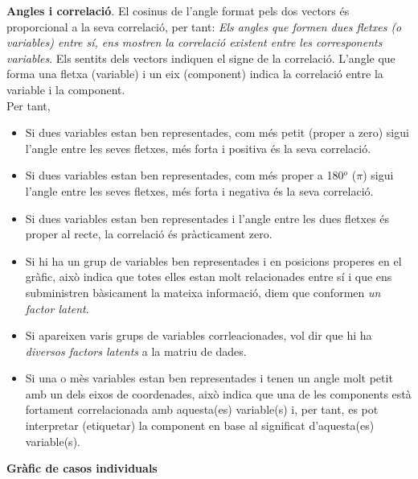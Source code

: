\documentclass[english]{article}
\begin{document}
\textbf{Angles i correlació}. El cosinus de l'angle format pels dos vectors és proporcional a la seva correlació, per tant: \textit{Els angles que formen dues fletxes (o variables) entre sí, ens mostren la correlació existent entre les corresponents variables}. Els sentits dels vectors indiquen el signe de la correlació. L'angle que forma una fletxa (variable) i un eix (component) indica la correlació entre la variable i la component.\\

Per tant,\\
\begin{itemize}
\item Si dues variables estan ben representades, com més petit (proper a zero) sigui l'angle entre les seves fletxes, més forta i positiva és la seva correlació.

\item Si dues variables estan ben representades, com més  proper a 180$^o$ ($\pi$) sigui l'angle entre les seves fletxes, més forta i negativa és la seva correlació.

\item Si dues variables estan ben representades i l'angle entre les dues fletxes és proper al recte, la correlació és pràcticament zero.

\item Si hi ha un grup de variables ben representades i en posicions properes en el gràfic, això indica que totes elles estan molt relacionades entre sí i que ens subministren bàsicament la mateixa informació, diem que conformen \textit{un factor latent}.

\item Si apareixen varis grups de variables corrleacionades, vol dir que hi ha \textit{diversos factors latents} a la matriu de dades.

\item Si una o mès  variables estan ben representades i tenen un angle molt petit amb un dels eixos de coordenades, això indica que una de les components  està fortament correlacionada amb aquesta(es) variable(s) i, per tant, es pot interpretar (etiquetar) la component en base al significat d'aquesta(es) variable(s).
\end{itemize}

\noindent\textbf{Gràfic de casos individuals}\\
\end{document}
